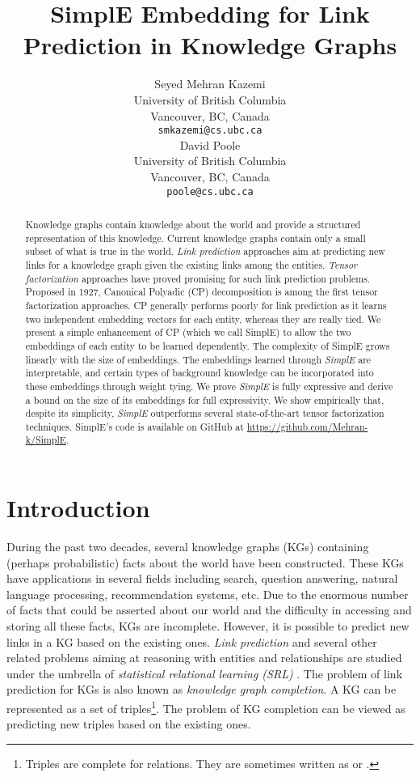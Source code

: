 \documentclass{article}
\title{SimplE Embedding for Link Prediction in Knowledge Graphs}
\author{
  Seyed Mehran Kazemi\\
  University of British Columbia\\
 Vancouver, BC, Canada \\
  \texttt{smkazemi@cs.ubc.ca} \\
\And
   David Poole \\
   University of British Columbia\\
  Vancouver, BC, Canada \\ 
    \texttt{poole@cs.ubc.ca} \\
}
\begin{document}
\maketitle

\begin{abstract}
Knowledge graphs contain knowledge about the world and provide a structured representation of this knowledge. 
Current knowledge graphs contain only a small subset of what is true in the world. 
\emph{Link prediction} approaches aim at predicting new links for a knowledge graph given the existing links among the entities. 
\emph{Tensor factorization} approaches have proved promising for such link prediction problems. 
Proposed in 1927, Canonical Polyadic (CP) decomposition is among the first tensor factorization approaches. 
CP generally performs poorly for link prediction as it learns two independent embedding vectors for each entity, whereas they are really tied.
We present a simple enhancement of CP (which we call SimplE) to allow the two embeddings of each entity to be learned dependently. 
The complexity of SimplE grows linearly with the size of embeddings. 
The embeddings learned through \emph{SimplE} are interpretable, and certain types of background knowledge can be incorporated into these embeddings through weight tying. 
We prove \emph{SimplE} is fully expressive and derive a bound on the size of its embeddings for full expressivity. 
We show empirically that, despite its simplicity, \emph{SimplE} outperforms several state-of-the-art tensor factorization techniques.
SimplE's code is available on GitHub at \url{https://github.com/Mehran-k/SimplE}.
\end{abstract}

\section{Introduction}
During the past two decades, several knowledge graphs (KGs) containing (perhaps probabilistic) facts about the world have been constructed. These KGs have applications in several fields including search, question answering, natural language processing, recommendation systems, etc. Due to the enormous number of facts that could be asserted about our world and the difficulty in accessing and storing all these facts, KGs are incomplete. However, it is possible to predict new links in a KG based on the existing ones. \emph{Link prediction} and several other related problems aiming at reasoning with entities and relationships are studied under the umbrella of \emph{statistical relational learning (SRL)} \cite{getoor2007introduction,nickel2016review,StarAI-Book}. The problem of link prediction for KGs is also known as \emph{knowledge graph completion}. A KG can be represented as a set of  triples\footnote{Triples are complete for relations. They are sometimes written as  or .}. The problem of KG completion can be viewed as predicting new triples based on the existing ones.
\end{document}

